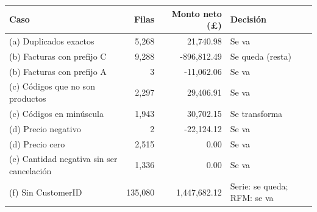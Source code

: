 \begin{tabular}{lrrl}
\toprule
Caso & Filas & Monto neto (\pounds) & Decisión \\
\midrule
(a) Duplicados exactos & 5,268 & 21,740.98 & Se va \\
(b) Facturas con prefijo C & 9,288 & -896,812.49 & Se queda (resta) \\
(b) Facturas con prefijo A & 3 & -11,062.06 & Se va \\
(c) Códigos que no son productos & 2,297 & 29,406.91 & Se va \\
(c) Códigos en minúscula & 1,943 & 30,702.15 & Se transforma \\
(d) Precio negativo & 2 & -22,124.12 & Se va \\
(d) Precio cero & 2,515 & 0.00 & Se va \\
(e) Cantidad negativa sin ser cancelación & 1,336 & 0.00 & Se va \\
(f) Sin CustomerID & 135,080 & 1,447,682.12 & Serie: se queda; RFM: se va \\
\bottomrule
\end{tabular}
